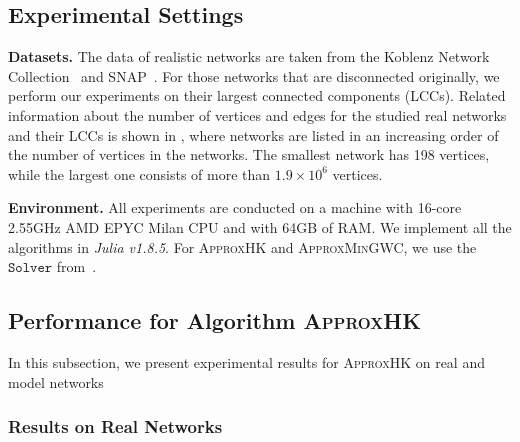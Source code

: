 \documentclass[10pt,twocolumn,twoside]{IEEEtran}
\begin{document}
\subsection{Experimental Settings}

\textbf{Datasets.} The data of realistic networks are taken from the Koblenz Network Collection~\cite{Ku13} and SNAP~\cite{LeKr14}. For those networks that are disconnected originally, we perform our experiments on their largest connected components (LCCs). Related information about the number of vertices and edges for the studied real networks and their LCCs is shown  in ,  where networks are listed in an increasing order of the number of vertices in the networks. The smallest network has 198 vertices, while the largest one consists of more than \(1.9 \times 10^{6}\) vertices.

\textbf{Environment.} All experiments are conducted on a machine with 16-core 2.55GHz AMD EPYC Milan CPU and with 64GB of RAM. We implement all the  algorithms in \textit{Julia v1.8.5}. For  \textsc{ApproxHK}  and  \textsc{ApproxMinGWC}, we use the  \(\mathtt{Solver}\) from~\cite{GaKySp23}. %

\subsection{Performance for Algorithm \textsc{ApproxHK} }

In this subsection, we present experimental results for \textsc{ApproxHK} on real and model networks

\subsubsection{Results on Real Networks}
\end{document}
